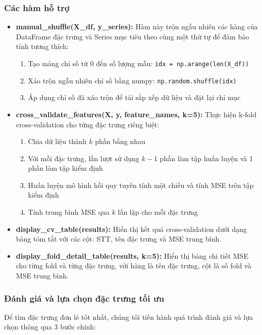 \subsubsection{Các hàm hỗ trợ}
\begin{itemize}
	\item \textbf{manual\_shuffle(X\_df, y\_series):} Hàm này trộn ngẫu nhiên các hàng của DataFrame đặc trưng và Series mục tiêu theo cùng một thứ tự để đảm bảo tính tương thích:
	      \begin{enumerate}
		      \item Tạo mảng chỉ số từ 0 đến số lượng mẫu: \texttt{idx = np.arange(len(X\_df))}
		      \item Xáo trộn ngẫu nhiên chỉ số bằng numpy: \texttt{np.random.shuffle(idx)}
		      \item Áp dụng chỉ số đã xáo trộn để tái sắp xếp dữ liệu và đặt lại chỉ mục
	      \end{enumerate}

	\item \textbf{cross\_validate\_features(X, y, feature\_names, k=5):} Thực hiện k-fold cross-validation cho từng đặc trưng riêng biệt:
	      \begin{enumerate}
		      \item Chia dữ liệu thành \(k\) phần bằng nhau
		      \item Với mỗi đặc trưng, lần lượt sử dụng \(k-1\) phần làm tập huấn luyện và 1 phần làm tập kiểm định
		      \item Huấn luyện mô hình hồi quy tuyến tính một chiều và tính MSE trên tập kiểm định
		      \item Tính trung bình MSE qua \(k\) lần lặp cho mỗi đặc trưng
	      \end{enumerate}

	\item \textbf{display\_cv\_table(results):} Hiển thị kết quả cross-validation dưới dạng bảng tóm tắt với các cột: STT, tên đặc trưng và MSE trung bình.

	\item \textbf{display\_fold\_detail\_table(results, k=5):} Hiển thị bảng chi tiết MSE cho từng fold và từng đặc trưng, với hàng là tên đặc trưng, cột là số fold và MSE trung bình.
\end{itemize}

\subsubsection{Đánh giá và lựa chọn đặc trưng tối ưu}
Để tìm đặc trưng đơn lẻ tốt nhất, chúng tôi tiến hành quá trình đánh giá và lựa chọn thông qua 3 bước chính:

